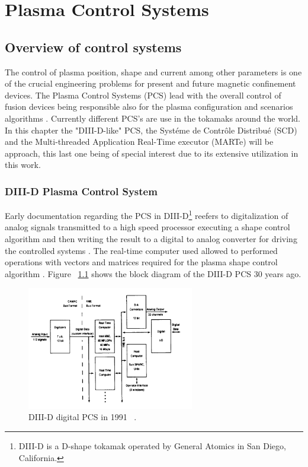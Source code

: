 \chapter{Plasma Control Systems}

\section{Overview of control systems}
The control of  plasma position, shape and current among other parameters is one of the crucial engineering problems for present and future magnetic confinement devices. The Plasma Control Systems (PCS) lead with the overall control of  fusion devices being responsible also for the  plasma configuration and scenarios algorithms \cite[Chapter~8]{PCS_2018}. Currently different PCS's are use in the tokamaks around the world. In this chapter the "DIII-D-like" PCS, the Syst\'eme de Contr\^ole Distribu\'e (SCD) and the Multi-threaded Application Real-Time executor (MARTe) will be approach, this last one being of special interest due to its extensive utilization in this work.

\subsection{DIII-D Plasma Control System}  

Early documentation regarding the PCS in DIII-D\footnote{DIII-D is a D-shape tokamak operated by General Atomics in San Diego, California. } reefers to digitalization of analog signals transmitted to a high speed processor executing a shape control algorithm and then writing the result to a digital to analog converter for driving the controlled systems . The real-time computer used allowed to performed operations with vectors and matrices required for the plasma shape control algorithm \cite{DIIDcontrol}. Figure ~\ref{DIII1991} shows the block diagram of the DIII-D PCS 30 years ago.
\hfil

\begin{figure}[htbp]
	\centering
	\includegraphics[width=0.65\textwidth]{Chp2/DIIDPCS_old.PNG}
	\caption{\label{DIII1991} DIII-D digital PCS in 1991 ~\cite{DIIDcontrol}.  }
\end{figure}

